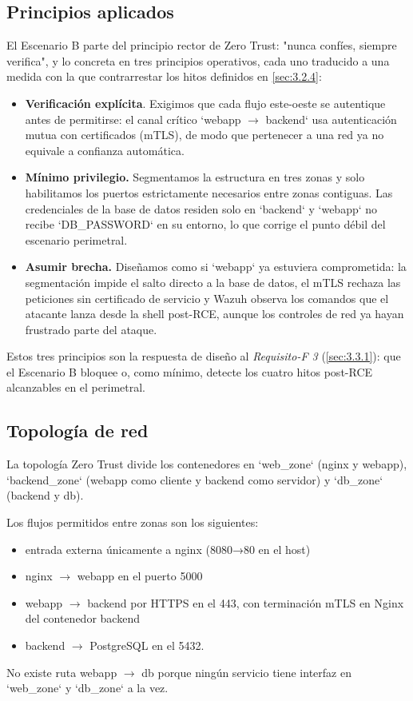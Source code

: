 \documentclass[11pt,spanish,listoffigures,listoftables]{tfgetsinf}
\begin{document}
        \subsection{Principios aplicados}
        El Escenario B parte del principio rector de Zero Trust: "nunca confíes, siempre verifica", y lo concreta en tres principios operativos, cada uno traducido a una medida con la que contrarrestar los hitos definidos en \cref{sec:3.2.4}:
        \begin{itemize}
            \item \textbf{Verificación explícita}. Exigimos que cada flujo este-oeste se autentique antes de permitirse: el canal crítico `webapp $\rightarrow$ backend` usa autenticación mutua con certificados (mTLS), de modo que pertenecer a una red ya no equivale a confianza automática.
            \item \textbf{Mínimo privilegio.} Segmentamos la estructura en tres zonas y solo habilitamos los puertos estrictamente necesarios entre zonas contiguas. Las credenciales de la base de datos residen solo en `backend` y `webapp` no recibe `DB\_PASSWORD` en su entorno, lo que corrige el punto débil del escenario perimetral.
            \item \textbf{Asumir brecha.} Diseñamos como si `webapp` ya estuviera comprometida: la segmentación impide el salto directo a la base de datos, el mTLS rechaza las peticiones sin certificado de servicio y Wazuh observa los comandos que el atacante lanza desde la shell post-RCE, aunque los controles de red ya hayan frustrado parte del ataque.
        \end{itemize}
        Estos tres principios son la respuesta de diseño al\textit{ Requisito-F 3} (\cref{sec:3.3.1}): que el Escenario B bloquee o, como mínimo, detecte los cuatro hitos post-RCE alcanzables en el perimetral.
        
        \subsection{Topología de red}
        La topología Zero Trust divide los contenedores en `web\_zone` (nginx y webapp), `backend\_zone` (webapp como cliente y backend como servidor) y `db\_zone` (backend y db). 
        
        Los flujos permitidos entre zonas son los siguientes:
        \begin{itemize}
            \item entrada externa únicamente a nginx (8080→80 en el host)
            \item nginx $\rightarrow$ webapp en el puerto 5000
            \item webapp $\rightarrow$ backend por HTTPS en el 443, con terminación mTLS en Nginx del contenedor backend
            \item backend $\rightarrow$ PostgreSQL en el 5432. 
        \end{itemize}
        No existe ruta webapp $\rightarrow$ db porque ningún servicio tiene interfaz en `web\_zone` y `db\_zone` a la vez.
        
\end{document}
